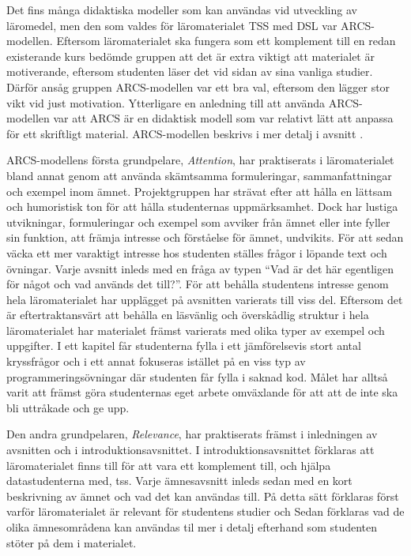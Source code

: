 \documentclass[12pt,a4paper,twoside,openright]{article}
\begin{document}
Det fins många didaktiska modeller som kan användas vid utveckling
av läromedel, men den som valdes för
läromaterialet TSS med DSL var ARCS-modellen. Eftersom
läromaterialet ska fungera som ett komplement till en
redan existerande kurs bedömde gruppen att det är extra viktigt att
materialet är motiverande, eftersom studenten läser det vid sidan av
sina vanliga studier. Därför ansåg gruppen ARCS-modellen var
ett bra val, eftersom den lägger stor vikt vid just motivation.
Ytterligare en anledning till att använda ARCS-modellen
var att ARCS är en didaktisk modell som var relativt lätt att
anpassa för ett skriftligt material.
ARCS-modellen beskrivs i mer detalj i avsnitt .


ARCS-modellens första grundpelare, \textit{Attention}, har
praktiserats i läromaterialet bland annat genom att använda skämtsamma formuleringar,
sammanfattningar och exempel inom ämnet. Projektgruppen har strävat efter att
hålla en lättsam och humoristisk ton för att hålla studenternas
uppmärksamhet. Dock har lustiga utvikningar,
formuleringar och exempel som avviker från ämnet eller inte fyller sin
funktion, att främja intresse och förståelse för ämnet, undvikits. För att sedan
väcka ett mer varaktigt intresse hos studenten ställes frågor i
löpande text och övningar. Varje avsnitt inleds med en fråga av typen
``Vad är det här egentligen för något och vad används det till?''. För
att behålla studentens intresse genom hela läromaterialet har upplägget
på avsnitten varierats till viss del. Eftersom det är eftertraktansvärt att
behålla en läsvänlig och överskådlig struktur i hela läromaterialet
har materialet  främst varierats med olika typer av exempel
och uppgifter. I ett kapitel får studenterna fylla i ett jämförelsevis
stort antal kryssfrågor och i ett annat fokuseras istället
på en viss typ av programmeringsövningar där studenten får fylla i
saknad kod. Målet har alltså varit att främst göra studenternas eget arbete
omväxlande för att att de inte ska bli uttråkade och ge upp.

Den andra grundpelaren, \textit{Relevance}, har praktiserats främst
i inledningen av avsnitten och i introduktionsavsnittet.
I introduktionsavsnittet förklaras att läromaterialet finns till för att
vara ett komplement till, och hjälpa datastudenterna med,
\gls{tss}. Varje ämnesavsnitt inleds sedan med en kort beskrivning av
ämnet och vad det kan användas till. På detta sätt förklaras
först varför läromaterialet är relevant för studentens
studier och Sedan förklaras vad de olika ämnesområdena
kan användas til mer i detalj efterhand som studenten stöter
på dem i materialet.
\end{document}
